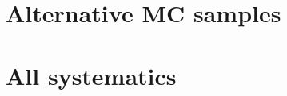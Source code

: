 
\clearpage
\section{Alternative MC samples}
\label{app:altsample}


\clearpage
\section{All systematics}
\label{app:allsyst}


